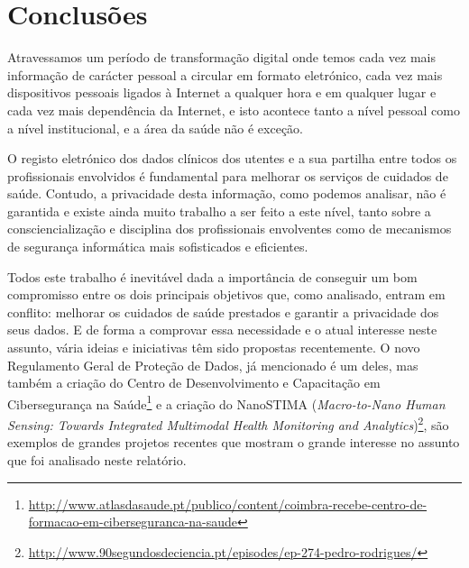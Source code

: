 \documentclass[conference]{IEEEtran}
\begin{document}

\section{Conclusões}	\label{concl}

Atravessamos um período de transformação digital onde temos cada vez mais informação de carácter pessoal a circular em formato eletrónico, cada vez mais
dispositivos pessoais ligados à Internet a qualquer hora e em qualquer lugar e cada vez mais dependência da Internet, e isto acontece tanto a nível pessoal como a nível institucional, e a área da saúde não é exceção.	

O registo eletrónico dos dados clínicos dos utentes e a sua partilha entre todos os profissionais envolvidos é fundamental para melhorar os serviços de cuidados de saúde. Contudo, a privacidade desta informação, como podemos analisar, não é garantida e existe ainda muito trabalho a ser feito a este nível, tanto sobre a consciencialização e disciplina dos profissionais envolventes como de mecanismos de segurança informática mais sofisticados e eficientes.

Todos este trabalho é inevitável dada a importância de conseguir um bom compromisso entre os dois principais objetivos que, como analisado, entram em conflito: melhorar os cuidados de saúde prestados e garantir a privacidade dos seus dados. E de forma a comprovar essa necessidade e o atual interesse neste assunto, vária ideias e iniciativas têm sido propostas recentemente. O novo Regulamento Geral de Proteção de Dados, já mencionado é um deles, mas também a criação do Centro de Desenvolvimento e Capacitação em Cibersegurança na Saúde\footnote{\url{http://www.atlasdasaude.pt/publico/content/coimbra-recebe-centro-de-formacao-em-ciberseguranca-na-saude}} e a criação do NanoSTIMA (\textit{Macro-to-Nano Human Sensing: Towards Integrated Multimodal Health Monitoring and Analytics})\footnote{\url{http://www.90segundosdeciencia.pt/episodes/ep-274-pedro-rodrigues/}}, são exemplos de grandes projetos recentes que mostram o grande interesse no assunto que foi analisado neste relatório.


{}

\end{document}
